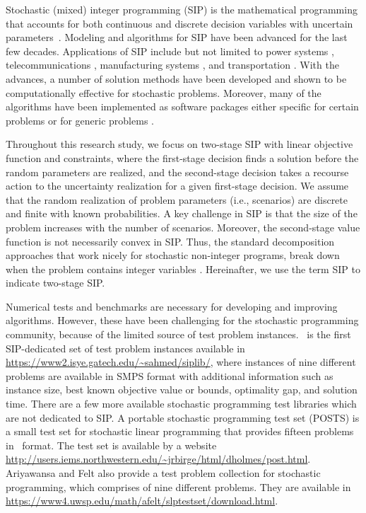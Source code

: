 Stochastic (mixed) integer programming (SIP) is the mathematical programming that accounts for 
both continuous and discrete decision variables with uncertain parameters~\cite{book:BL2011}. 
Modeling and algorithms for SIP have been advanced for the last few decades. Applications of SIP include but not limited to power systems \cite{journal:PO2013,journal:KYZC2017}, telecommunications \cite{journal:SDC1994}, manufacturing systems \cite{journal:SPR1994,journal:AG2004}, and transportation \cite{journal:MW1969,journal:PGM2017,journal:TPP2017,journal:MPT2014}. With the advances, a number of solution methods have been developed and shown to be computationally effective for stochastic problems. Moreover, many of the algorithms have been implemented as software packages either specific for certain problems or for generic problems \cite{SCIP,journal:WWH2012,journal:KZ2015}.

Throughout this research study, we focus on two-stage SIP with 
linear objective function and constraints, where the first-stage decision finds a solution before the 
random parameters are realized, and the second-stage decision takes a recourse action to the 
uncertainty realization for a given first-stage decision. We assume that the random realization of problem parameters (i.e., scenarios) are discrete and finite with known probabilities.
A key challenge in SIP is that the size of
the problem increases with the number of scenarios. Moreover, the 
second-stage value function is not necessarily convex in SIP. Thus, the standard decomposition 
approaches that work nicely for stochastic non-integer programs, break down when the problem contains integer variables \cite{journal:AG2004}. Hereinafter, we use the 
term SIP to indicate two-stage SIP. 

Numerical tests and benchmarks are necessary for developing and improving algorithms. However,
these have been challenging for the stochastic programming community, because of the limited source of test problem instances. 
\siplib\ is the first SIP-dedicated set of test problem instances available in \url{https://www2.isye.gatech.edu/~sahmed/siplib/}, where instances of nine different problems are available in SMPS format \cite{smps} with additional information such as instance size, best known objective value or bounds, optimality gap, and solution time. There are a few more available stochastic programming test libraries which are not dedicated to SIP.
A portable stochastic programming test set (POSTS) \cite{POSTS} is a small test set for 
stochastic linear programming that provides fifteen problems in \smps\ format. The test set is available by a website \url{http://users.iems.northwestern.edu/~jrbirge/html/dholmes/post.html}. Ariyawansa and Felt \cite{journal:AF2004} also provide a test problem collection for stochastic programming, which comprises of nine different problems. They are available in \url{https://www4.uwsp.edu/math/afelt/slptestset/download.html}. 

